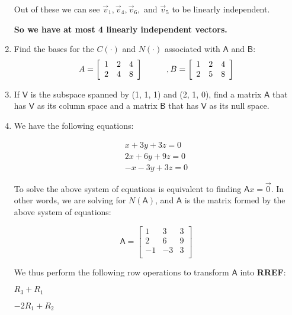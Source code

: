 \documentclass[a4paper, 11pt]{article}
\newcommand{\mat}[1]{\boldsymbol { \mathsf{#1}} }
\begin{document}
\begin{enumerate}
Out of these we can see $\vec v_1, \vec v_4, \vec v_6,$ and $\vec v_5$ to be linearly independent.

\textbf{So we have at most 4 linearly independent vectors.}


\item Find the bases for the $C(\mat \cdot)$ and $N(\mat \cdot)$ associated with $\mat A$ and $\mat B$:
\[ A = \left[ \begin{array}{ccc}
1&2&4\\
2&4&8
\end{array} \right]
\hspace{10mm}, B = \left[ \begin{array}{ccc}
1&2&4\\
2&5&8
\end{array} \right]\]

\item If $\mat V$ is the subspace spanned by (1, 1, 1) and (2, 1, 0), find a matrix $\mat A$ that has $\mat V$ as its column space and a matrix $\mat B$ that has $\mat V$ as its null space.


\item We have the following equations:

\begin{equation} \label{eq1}
\begin{split}
x + 3y + 3z  = 0\\
2x + 6y + 9z = 0\\
-x - 3y +3z  = 0
\end{split}
\end{equation}

To solve the above system of equations is equivalent to finding $\mat{A}x = \vec{0}$. In other words, we are solving for $N(\mat{A})$, and $\mat{A}$ is the matrix formed by the above system of equations:

\begin{equation*}
    \mat{A} =
    \begin{bmatrix}
    1 & 3 & 3 \\
    2 & 6 & 9 \\
    -1 & -3 & 3 \\
    \end{bmatrix}
\end{equation*}

We thus perform the following row operations to transform $\mat{A}$ into \textbf{RREF}: 

\begin{center}
$R_3 + R_1$

$-2R_1 + R_2$


\end{center}
\end{enumerate}
\end{document}
